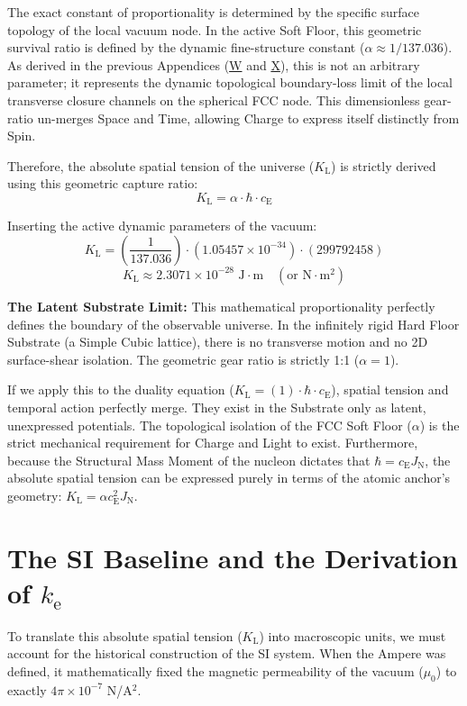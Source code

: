 The exact constant of proportionality is determined by the specific surface topology of the local vacuum node. In the active Soft Floor, this geometric survival ratio is defined by the dynamic fine-structure constant ($\alpha \approx 1/137.036$). As derived in the previous Appendices (\hyperref[app:geometric_alpha]{W} and \hyperref[app:dynamic_alpha]{X}), this is not an arbitrary parameter; it represents the dynamic topological boundary-loss limit of the local transverse closure channels on the spherical FCC node. This dimensionless gear-ratio un-merges Space and Time, allowing Charge to express itself distinctly from Spin.

Therefore, the absolute spatial tension of the universe ($K_{\mathrm{L}}$) is strictly derived using this geometric capture ratio:
\begin{equation}
    K_{\mathrm{L}} = \alpha \cdot \hbar \cdot c_{\mathrm{E}}
\end{equation}

Inserting the active dynamic parameters of the vacuum:
\begin{equation}
    K_{\mathrm{L}} = \left(\frac{1}{137.036}\right) \cdot (1.05457 \times 10^{-34}) \cdot (299792458)
\end{equation}
\begin{equation}
    K_{\mathrm{L}} \approx 2.3071 \times 10^{-28} \text{ J}\cdot\text{m} \quad (\text{or N}\cdot\text{m}^2)
\end{equation}

\noindent\textbf{The Latent Substrate Limit:} This mathematical proportionality perfectly defines the boundary of the observable universe. In the infinitely rigid Hard Floor Substrate (a Simple Cubic lattice), there is no transverse motion and no 2D surface-shear isolation. The geometric gear ratio is strictly 1:1 ($\alpha = 1$). 

If we apply this to the duality equation ($K_{\mathrm{L}} = (1) \cdot \hbar \cdot c_{\mathrm{E}}$), spatial tension and temporal action perfectly merge. They exist in the Substrate only as latent, unexpressed potentials. The topological isolation of the FCC Soft Floor ($\alpha$) is the strict mechanical requirement for Charge and Light to exist. Furthermore, because the Structural Mass Moment of the nucleon dictates that $\hbar = c_{\mathrm{E}} J_{\mathrm{N}}$, the absolute spatial tension can be expressed purely in terms of the atomic anchor's geometry: $K_{\mathrm{L}} = \alpha c_{\mathrm{E}}^2 J_{\mathrm{N}}$.

\section{The SI Baseline and the Derivation of $k_{\mathrm{e}}$}
To translate this absolute spatial tension ($K_{\mathrm{L}}$) into macroscopic units, we must account for the historical construction of the SI system. When the Ampere was defined, it mathematically fixed the magnetic permeability of the vacuum ($\mu_0$) to exactly $4\pi \times 10^{-7}$ N/A$^2$.

